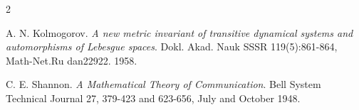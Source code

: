 \backmatter
{}
\begin{thebibliography}{2}

A. N. Kolmogorov. \emph{A new metric invariant of transitive dynamical systems and automorphisms of Lebesgue spaces}. Dokl. Akad. Nauk SSSR 119(5):861-864, Math-Net.Ru dan22922. 1958.

C. E. Shannon. \emph{A Mathematical Theory of Communication}. Bell System Technical Journal 27, 379-423 and 623-656, July and October 1948.

\end{thebibliography}
